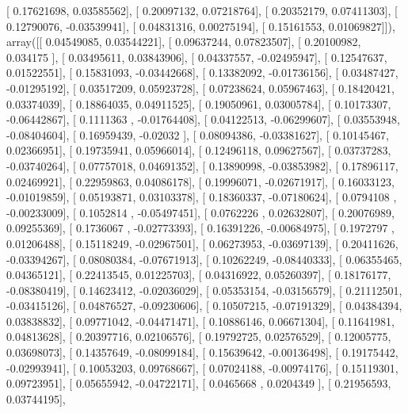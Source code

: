 \documentclass{article}
\begin{document}
       [ 0.17621698,  0.03585562],
       [ 0.20097132,  0.07218764],
       [ 0.20352179,  0.07411303],
       [ 0.12790076, -0.03539941],
       [ 0.04831316,  0.00275194],
       [ 0.15161553,  0.01069827]]), array([[ 0.04549085,  0.03544221],
       [ 0.09637244,  0.07823507],
       [ 0.20100982,  0.034175  ],
       [ 0.03495611,  0.03843906],
       [ 0.04337557, -0.02495947],
       [ 0.12547637,  0.01522551],
       [ 0.15831093, -0.03442668],
       [ 0.13382092, -0.01736156],
       [ 0.03487427, -0.01295192],
       [ 0.03517209,  0.05923728],
       [ 0.07238624,  0.05967463],
       [ 0.18420421,  0.03374039],
       [ 0.18864035,  0.04911525],
       [ 0.19050961,  0.03005784],
       [ 0.10173307, -0.06442867],
       [ 0.1111363 , -0.01764408],
       [ 0.04122513, -0.06299607],
       [ 0.03553948, -0.08404604],
       [ 0.16959439, -0.02032   ],
       [ 0.08094386, -0.03381627],
       [ 0.10145467,  0.02366951],
       [ 0.19735941,  0.05966014],
       [ 0.12496118,  0.09627567],
       [ 0.03737283, -0.03740264],
       [ 0.07757018,  0.04691352],
       [ 0.13890998, -0.03853982],
       [ 0.17896117,  0.02469921],
       [ 0.22959863,  0.04086178],
       [ 0.19996071, -0.02671917],
       [ 0.16033123, -0.01019859],
       [ 0.05193871,  0.03103378],
       [ 0.18360337, -0.07180624],
       [ 0.0794108 , -0.00233009],
       [ 0.1052814 , -0.05497451],
       [ 0.0762226 ,  0.02632807],
       [ 0.20076989,  0.09255369],
       [ 0.1736067 , -0.02773393],
       [ 0.16391226, -0.00684975],
       [ 0.1972797 ,  0.01206488],
       [ 0.15118249, -0.02967501],
       [ 0.06273953, -0.03697139],
       [ 0.20411626, -0.03394267],
       [ 0.08080384, -0.07671913],
       [ 0.10262249, -0.08440333],
       [ 0.06355465,  0.04365121],
       [ 0.22413545,  0.01225703],
       [ 0.04316922,  0.05260397],
       [ 0.18176177, -0.08380419],
       [ 0.14623412, -0.02036029],
       [ 0.05353154, -0.03156579],
       [ 0.21112501, -0.03415126],
       [ 0.04876527, -0.09230606],
       [ 0.10507215, -0.07191329],
       [ 0.04384394,  0.03838832],
       [ 0.09771042, -0.04471471],
       [ 0.10886146,  0.06671304],
       [ 0.11641981,  0.04813628],
       [ 0.20397716,  0.02106576],
       [ 0.19792725,  0.02576529],
       [ 0.12005775,  0.03698073],
       [ 0.14357649, -0.08099184],
       [ 0.15639642, -0.00136498],
       [ 0.19175442, -0.02993941],
       [ 0.10053203,  0.09768667],
       [ 0.07024188, -0.00974176],
       [ 0.15119301,  0.09723951],
       [ 0.05655942, -0.04722171],
       [ 0.0465668 ,  0.0204349 ],
       [ 0.21956593,  0.03744195],
\end{document}

